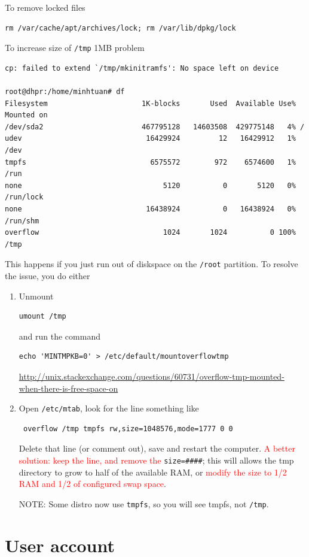 To remove locked files
\begin{verbatim}
rm /var/cache/apt/archives/lock; rm /var/lib/dpkg/lock
\end{verbatim}

To increase size of \verb!/tmp! 1MB problem
\begin{verbatim}
cp: failed to extend `/tmp/mkinitramfs': No space left on device

root@dhpr:/home/minhtuan# df
Filesystem                      1K-blocks       Used  Available Use% Mounted on
/dev/sda2                       467795128   14603508  429775148   4% /
udev                             16429924         12   16429912   1% /dev
tmpfs                             6575572        972    6574600   1% /run
none                                 5120          0       5120   0% /run/lock
none                             16438924          0   16438924   0% /run/shm
overflow                             1024       1024          0 100% /tmp
\end{verbatim}
This happens if you just run out of diskspace on the \verb!/root! partition. To
resolve the issue, you do either 
\begin{enumerate}
  \item Unmount 
\begin{verbatim}
umount /tmp
\end{verbatim}
and run the command
\begin{verbatim}
echo 'MINTMPKB=0' > /etc/default/mountoverflowtmp
\end{verbatim}
\url{http://unix.stackexchange.com/questions/60731/overflow-tmp-mounted-when-there-is-free-space-on}

  \item Open \verb!/etc/mtab!, look for the line something like
\begin{verbatim}
 overflow /tmp tmpfs rw,size=1048576,mode=1777 0 0
\end{verbatim}
Delete that line (or comment out), save and restart the computer.
\textcolor{red}{A better solution: keep the line, and remove the}
\verb!size=####!; this will allows the tmp directory to grow to half of the
available RAM, or \textcolor{red}{modify the size to 1/2 RAM and 1/2 of configured swap space}.

NOTE: Some distro now use \verb!tmpfs!, so you will see tmpfs, not \verb!/tmp!.


\end{enumerate}

\section{User account}
\label{sec:user_account}

